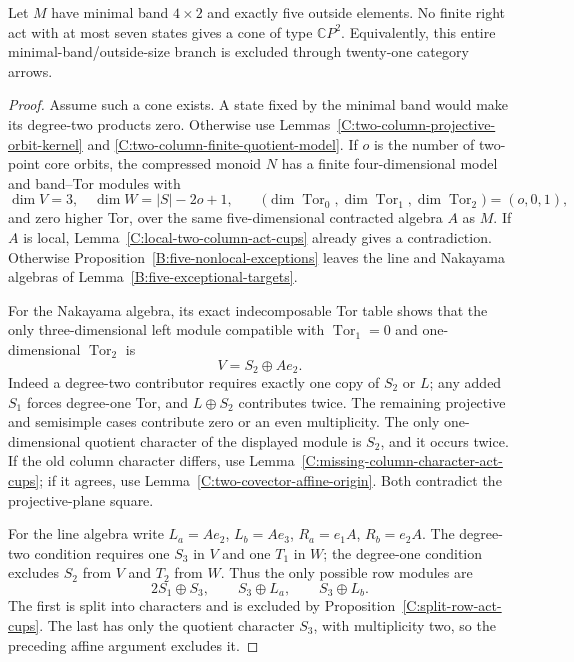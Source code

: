 \begin{theorem}
\label{C:four-row-five-outside-seven-states}
Let $M$ have minimal band $4\times2$ and exactly five outside
elements.  No finite right act with at most seven states
gives a cone of type $\mathbb CP^2$.
Equivalently, this entire minimal-band/outside-size branch
is excluded through twenty-one category arrows.
\end{theorem}
\begin{proof}
Assume such a cone exists.  A state fixed by the minimal band
would make its degree-two products zero.  Otherwise use
Lemmas~\ref{C:two-column-projective-orbit-kernel} and
\ref{C:two-column-finite-quotient-model}.
If $o$ is the number of two-point core orbits, the compressed
monoid $N$ has a finite four-dimensional model and band--Tor
modules with
\[
 \dim V=3,\quad \dim W=|S|-2o+1,\qquad
 \bigl(\dim\operatorname{Tor}_0,
       \dim\operatorname{Tor}_1,
       \dim\operatorname{Tor}_2\bigr)=(o,0,1),
\]
and zero higher Tor, over the same five-dimensional contracted
algebra $A$ as $M$.
If $A$ is local, Lemma~\ref{C:local-two-column-act-cups}
already gives a contradiction.  Otherwise
Proposition~\ref{B:five-nonlocal-exceptions} leaves the line
and Nakayama algebras of Lemma~\ref{B:five-exceptional-targets}.

For the Nakayama algebra, its exact indecomposable Tor table
shows that the only three-dimensional left module compatible
with $\operatorname{Tor}_1=0$ and one-dimensional
$\operatorname{Tor}_2$ is
\[
 V=S_2\oplus Ae_2.
\]
Indeed a degree-two contributor requires exactly one copy of
$S_2$ or $L$; any added $S_1$ forces degree-one Tor, and
$L\oplus S_2$ contributes twice.  The remaining projective
and semisimple cases contribute zero or an even multiplicity.
The only one-dimensional quotient character of the displayed
module is $S_2$, and it occurs twice.
If the old column character differs, use
Lemma~\ref{C:missing-column-character-act-cups}; if it agrees,
use Lemma~\ref{C:two-covector-affine-origin}.
Both contradict the projective-plane square.

For the line algebra write
$L_a=Ae_2$, $L_b=Ae_3$, $R_a=e_1A$, $R_b=e_2A$.
The degree-two condition requires one $S_3$ in $V$ and one
$T_1$ in $W$; the degree-one condition excludes $S_2$ from
$V$ and $T_2$ from $W$.
Thus the only possible row modules are
\[
 2S_1\oplus S_3,\qquad S_3\oplus L_a,
 \qquad S_3\oplus L_b.
\]
The first is split into characters and is excluded by
Proposition~\ref{C:split-row-act-cups}.
The last has only the quotient character $S_3$, with
multiplicity two, so the preceding affine argument excludes it.


\end{proof}
